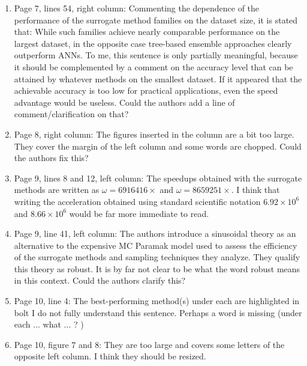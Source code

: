 \documentclass[12pt]{article}
\begin{document}
\begin{enumerate}
{\bf }

\item Page 7, lines 54, right column:
Commenting the dependence of the performance of the surrogate method families on the dataset size, it is stated that: While such families achieve nearly comparable performance on the largest dataset, in the opposite case tree-based ensemble approaches clearly outperform ANNs. To me, this sentence is only partially meaningful, because it should be complemented by a comment on the accuracy level that can be attained by whatever methods on the smallest dataset. If it appeared that the achievable accuracy is too low for practical applications, even the speed advantage would be useless. Could the authors add a line of comment/clarification on that?

{\bf }

\item Page 8, right column:
The figures inserted in the column are a bit too large. They cover the margin of the left column and some words are chopped. Could the authors fix this?

{\bf }

\item Page 9, lines 8 and 12, left column:
The speedups obtained with the surrogate methods are written as $\omega = 6916416 \times$ and $\omega = 8659251 \times$. I think that writing the acceleration obtained using standard scientific notation $6.92 \times 10^6$ and $8.66 \times 10^6$ would be far more immediate to read.

{\bf }

\item Page 9, line 41, left column:
The authors introduce a sinusoidal theory as an alternative to the expensive MC Paramak model used to assess the efficiency of the surrogate methods and sampling techniques they analyze. They qualify this theory as robust. It is by far not clear to be what the word robust means in this context. Could the authors clarify this?

{\bf }

\item Page 10, line 4:
The best-performing method(s) under each are highlighted in bolt I do not fully understand this sentence. Perhaps a word is missing (under each ... what ... ? )

{\bf }

\item Page 10, figure 7 and 8:
They are too large and covers some letters of the opposite left column. I think they should be resized.


\end{enumerate}
\end{document}
